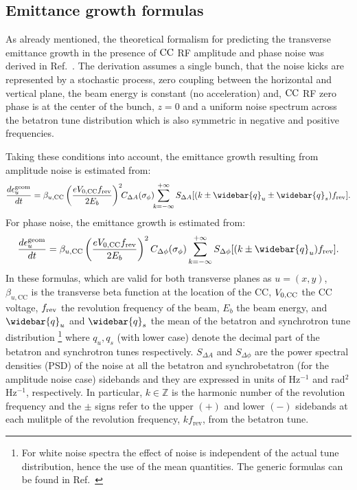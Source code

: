 \subsection{Emittance growth formulas}\label{subsec:CC_emit_growth_theoretical_formulas}
As already mentioned, the theoretical formalism for predicting the transverse emittance growth in the presence of ${\mathrm{CC}}$ RF amplitude and phase noise was derived in Ref.~\cite{PhysRevSTAB.18.101001}. The derivation assumes a single bunch, that the noise kicks are represented by a stochastic process, zero coupling between the horizontal and vertical plane, the beam energy is constant (no acceleration) and, ${\mathrm{CC}}$ RF zero phase is at the center of the bunch, $z=0$ and a uniform noise spectrum across the betatron tune distribution which is also symmetric in negative and positive frequencies. 

Taking these conditions into account, the emittance growth resulting from amplitude noise is estimated from:
\begin{equation}\label{eq:dey_an}
    \frac{d\epsilon^{\mathrm{geom}}_u}{dt}  = \beta_{u, \mathrm{CC}} \left( \frac{e\CCvoltage\frev}{2E_b}\right)^2 \!\! C_{\Delta A} (\sigma_{\phi}) \!\! \sum_{k=-\infty}^{+\infty} S_{\Delta A}[(k \pm \widebar{q}_u \pm \widebar{q}_s)\frev].
\end{equation}
For phase noise, the emittance growth is estimated from:
\begin{equation}\label{eq:dey_pn}
    \frac{d\epsilon^{\mathrm{geom}}_u}{dt}  = \beta_{u, \mathrm{CC}}  \left( \frac{e\CCvoltage\frev}{2E_b}\right)^2 C_{\Delta \phi} (\sigma_{\phi}) \sum_{k=-\infty}^{+\infty} S_{\Delta \phi}[(k \pm \widebar{q}_u) \frev].
\end{equation}
In these formulas, which are valid for both transverse planes as $u=(x,y)$, $\beta_{u, \mathrm{CC}}$ is the transverse beta function at the location of the CC, ${V_\mathrm{0, CC}}$ the CC voltage, ${f_\mathrm{rev}}$ the revolution frequency of the beam, $E_b$ the beam energy, and $\widebar{q}_u$ and $\widebar{q}_s$ the mean of the betatron and synchrotron tune distribution \footnote{For white noise spectra the effect of noise is independent of the actual tune distribution, hence the use of the mean quantities. The generic formulas can be found in Ref.~\cite{PhysRevSTAB.18.101001}} where $q_u, q_s$ (with lower case) denote the decimal part of the betatron and synchrotron tunes respectively. $S_{\Delta A}$ and $S_{\Delta \phi}$ are the power spectral densities (PSD) of the noise at all the betatron and synchrobetatron (for the amplitude noise case) sidebands and they are expressed in units of Hz$^{-1}$ and rad$^2$Hz$^{-1}$, respectively. In particular, $k \in \mathbb{Z}$ is the harmonic number of the revolution frequency and the $\pm$ signs refer to the upper $(+)$ and lower $(-)$ sidebands at each mulitple of the revolution frequency, $k f_\mathrm{rev}$, from the betatron tune.

